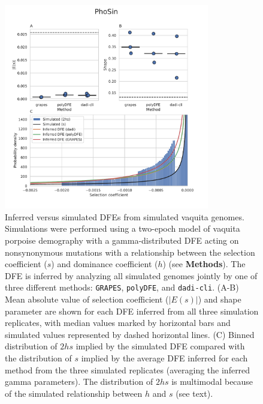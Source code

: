 \documentclass[hidelinks]{article}
\newcommand{\polydfe}{\texttt{polyDFE}\xspace}
\newcommand{\dadicli}{\texttt{dadi-cli}\xspace}
\newcommand{\grapes}{\texttt{GRAPES}\xspace}
\begin{document}
    \begin{figure}[b!]
        \centering
        \includegraphics[width=0.8\textwidth]{figures/PhoSin/Vaquita2Epoch_1R22/PhoSin_Vaquita2Epoch_1R22_Gamma_R22_Phocoena_sinus.mPhoSin1.pri.110_exons_DFE_plot.pdf}
        \caption{
        \label{fig:vaquita-dfe}
        Inferred versus simulated DFEs from simulated vaquita genomes.
        Simulations were performed using a two-epoch model of vaquita porpoise demography with a gamma-distributed DFE
        acting on nonsynonymous mutations with a relationship between the selection coefficient ($s$) and dominance coefficient ($h$) (see \textbf{Methods}).
        The DFE is inferred by analyzing all simulated genomes jointly by one of three different methods:
        \grapes, \polydfe, and \dadicli.
        (A-B) Mean absolute value of selection coefficient ($\lvert E(s) \rvert $) and shape parameter are
        shown for each DFE inferred from all three simulation replicates,
        with median values marked by horizontal bars
        and simulated values represented by dashed horizontal lines.
        (C) Binned distribution of $2hs$ implied by the simulated DFE compared with
        the distribution of $s$ implied by the average DFE inferred for each method from the three simulated replicates (averaging the inferred gamma parameters).
        The distribution of $2 h s$ is multimodal because of the simulated relationship between $h$ and $s$ (see text).
        }
    \end{figure}
\end{document}
